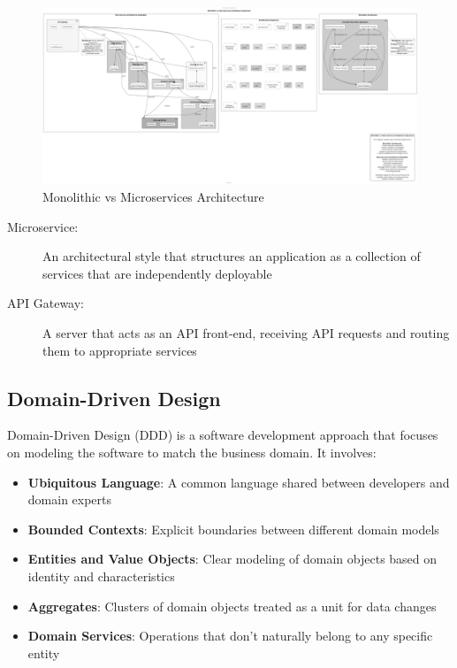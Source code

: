 \begin{figure}[p]
    \centering
    \includegraphics[width=\textwidth]{./Chapter02/figures/Monolithic_vs_Microservices.png}
    \caption{Monolithic vs Microservices Architecture}
    \label{fig:mono-vs-micro}
\end{figure}
\clearpage

\begin{terminology}
\begin{description}
    \item[Microservice:] An architectural style that structures an application as a collection of services that are independently deployable
    \item[API Gateway:] A server that acts as an API front-end, receiving API requests and routing them to appropriate services
\end{description}
\end{terminology}

\subsection{Domain-Driven Design}

Domain-Driven Design (DDD) is a software development approach that focuses on modeling the software to match the business domain. It involves:

\begin{itemize}
    \item \textbf{Ubiquitous Language}: A common language shared between developers and domain experts
    \item \textbf{Bounded Contexts}: Explicit boundaries between different domain models
    \item \textbf{Entities and Value Objects}: Clear modeling of domain objects based on identity and characteristics
    \item \textbf{Aggregates}: Clusters of domain objects treated as a unit for data changes
    \item \textbf{Domain Services}: Operations that don't naturally belong to any specific entity
\end{itemize}

